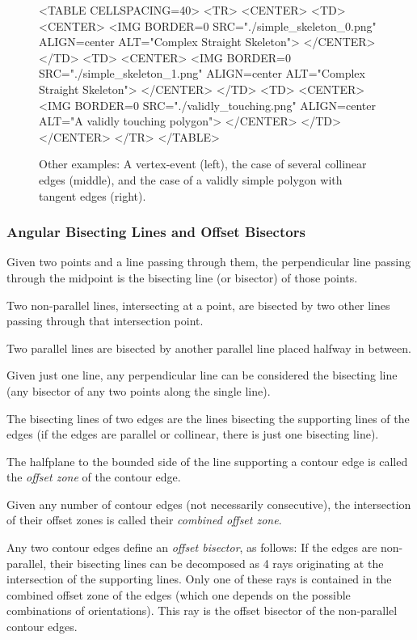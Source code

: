 \begin{figure}[htbp]
\begin{ccHtmlOnly}
<TABLE CELLSPACING=40>
<TR>
<CENTER>
<TD>
<CENTER>
<IMG BORDER=0 SRC="./simple_skeleton_0.png" ALIGN=center ALT="Complex Straight Skeleton">
</CENTER>
</TD>
<TD>
<CENTER>
<IMG BORDER=0 SRC="./simple_skeleton_1.png" ALIGN=center ALT="Complex Straight Skeleton">
</CENTER>
</TD>
<TD>
<CENTER>
<IMG BORDER=0 SRC="./validly_touching.png" ALIGN=center ALT="A validly touching polygon">
</CENTER>
</TD>
</CENTER>
</TR>
</TABLE>
\end{ccHtmlOnly}

\caption{Other examples: A vertex-event (left), the case of several collinear edges (middle), and the case of a validly simple polygon with tangent edges (right).
\label{MoreSLS}}
\end{figure}
  
\subsubsection{Angular Bisecting Lines and Offset Bisectors}  

Given two points and a line passing through them, the perpendicular line passing through the midpoint is the bisecting line (or bisector) of those points.

Two non-parallel lines, intersecting at a point, are bisected by two
other lines passing through that intersection point.

Two parallel lines are bisected by another parallel line placed
halfway in between.

Given just one line, any perpendicular line can be considered the
bisecting line (any bisector of any two points along the single line).

The bisecting lines of two edges are the lines bisecting the
supporting lines of the edges (if the edges are parallel or collinear,
there is just one bisecting line).

The halfplane to the bounded side of the line supporting a contour edge is
called the {\em offset zone} of the contour edge.

Given any number of contour edges (not necessarily consecutive), the
intersection of their offset zones is called their {\em combined
offset zone}.

Any two contour edges define an {\em offset bisector}, as follows: If
the edges are non-parallel, their bisecting lines can be decomposed as
4 rays originating at the intersection of the supporting lines. Only
one of these rays is contained in the combined offset zone of the
edges (which one depends on the possible combinations of
orientations). This ray is the offset bisector of the non-parallel
contour edges.

